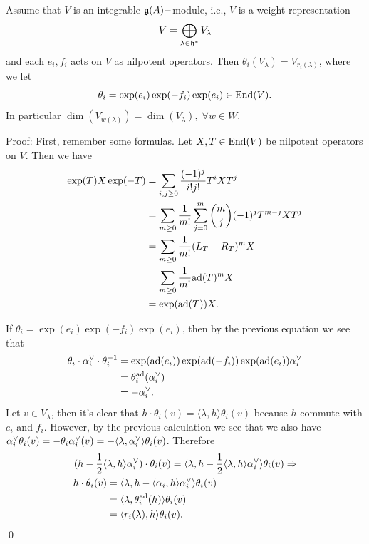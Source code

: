 \begin{dang}
    \begin{corollary}
        Assume that $V$ is an integrable $\mathfrak{g}(A)-$module, i.e., $V$ is a weight representation
        \begin{equation}
            V = \bigoplus_{\lambda\in\mathfrak{h}^*}V_\lambda
        \end{equation}
        and each $e_i,f_i$ acts on $V$ as nilpotent operators.  
        Then $\theta_i(V_\lambda) = V_{r_i(\lambda)}$, where we let
        \begin{equation}
            \theta_i = \exp(e_i)\exp(-f_i)\exp(e_i)\in \text{End}(V).
        \end{equation} 
        In particular $\dim(V_{w(\lambda)}) = \dim(V_\lambda),\;\forall w\in W$.
    \end{corollary}
\end{dang}
Proof: First, remember some formulas. Let $X,T\in\text{End}(V)$ be nilpotent operators on $V$. Then we have 
\begin{equation}
    \begin{split}
        \exp(T)X\exp(-T) &= \sum_{i,j\geq0}\frac{(-1)^j}{i!j!}T^iXT^j\\
        &=\sum_{m\geq0}\frac{1}{m!}\sum_{j=0}^m\binom{m}{j}(-1)^jT^{m-j}XT^j\\
        &=\sum_{m\geq0}\frac{1}{m!}(L_T - R_T)^mX\\
        &=\sum_{m\geq0}\frac{1}{m!}\text{ad}(T)^mX\\
        &=\exp(\text{ad}(T))X.
    \end{split}
\end{equation}

If $\theta_i = \exp(e_i)\exp(-f_i)\exp(e_i)$, then by the previous equation we see that 
\begin{equation}
    \begin{split}
        \theta_i\cdot\alpha^{\vee}_i\cdot\theta_i^{-1} &= \exp(\text{ad}(e_i))\exp(\text{ad}(-f_i))\exp(\text{ad}(e_i))\alpha^{\vee}_i\\
        &=\theta_i^{\text{ad}}(\alpha^{\vee}_i)\\
        &=-\alpha^{\vee}_i.
    \end{split}
\end{equation} 
Let $v\in V_\lambda$, then it's clear that $h\cdot\theta_i(v) = \langle \lambda,h\rangle \theta_i(v)$ because 
$h$ commute with $e_i$ and $f_i$. However, by the previous calculation we see that we also have 
$\alpha^{\vee}_i\theta_i(v) = -\theta_i\alpha^{\vee}_i(v)=-\langle \lambda,\alpha^{\vee}_i\rangle\theta_i(v)$. Therefore
\begin{equation}
    \begin{split}
        (h - \frac12\langle &\lambda, h\rangle\alpha^{\vee}_i)\cdot\theta_i(v) =
        \langle \lambda, h - \frac12\langle \lambda, h\rangle\alpha^{\vee}_i\rangle \theta_i(v)\Rightarrow\\
        h\cdot\theta_i(v) &= \langle\lambda, h - \langle\alpha_i,h\rangle\alpha^{\vee}_i\rangle\theta_i(v)\\
        & = \langle\lambda,\theta_i^{\text{ad}}(h)\rangle \theta_i(v)\\
        &= \langle r_i(\lambda),h\rangle \theta_i(v).
    \end{split}
\end{equation}
\qed


